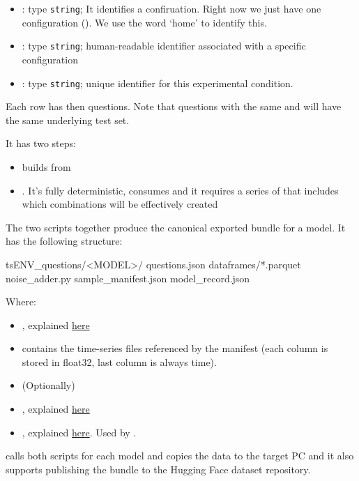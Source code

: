 \documentclass[11pt]{article}
\begin{document}
\begin{itemize}
\begin{itemize}
    \item {}:  type \texttt{string}; It identifies a  confiruation. Right now we just have one configuration (). We use the word `home' to identify this.
    \item {}: type \texttt{string}; human-readable identifier associated with a specific  configuration
    \item {}: type \texttt{string}; unique identifier for this experimental condition.
  \end{itemize}
    Each row has then  questions. Note that questions with the same  and  will have the same underlying test set.
\end{itemize}
It has two steps:
\begin{itemize}
\item {} builds  from 
\item {}. It's fully deterministic, consumes  and it requires a series of  that includes which combinations will be effectively created

\end{itemize}

The two scripts together produce the canonical exported bundle for a model. It has the following structure:

\begin{DocCode}
tsENV_questions/<MODEL>/
  questions.json
  dataframes/*.parquet
  noise_adder.py
  sample_manifest.json 
  model_record.json
\end{DocCode}
Where:
\begin{itemize}
\item {}, explained \hyperref[sec:questions-json-schema]{here}
\item {} contains the time-series files referenced by the manifest (each column is stored in float32, last column is always time).
\item (Optionally) 
\item {}, explained \hyperref[sec:sample-manifest-json-schema]{here}
\item {}, explained \hyperref[sec:model-record-json-schema]{here}. Used by .
\end{itemize}
 calls both scripts for each model and copies the data to the target PC and it also supports publishing the bundle to the Hugging Face dataset repository.
\end{document}
